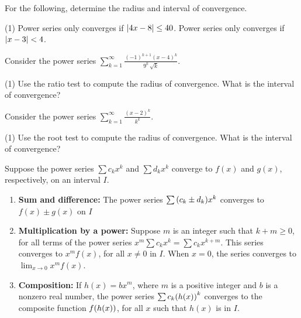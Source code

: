 \documentclass[../mathNotesPreamble]{subfiles}
\begin{document}
  \begin{ex*}[\textcolor{blue}{LC 28.4-28.5}]
    For the following, determine the radius and interval of convergence.
  \end{ex*}
  \begin{tasks}[after-item-skip=\stretch{1}, label=,item-indent=0pt](1)
    \task Power series only converges if ${\left\vert4x-8\right\vert}\leq 40$.
    \task Power series only converges if ${\left\vert x-3\right\vert}< 4$.
  \end{tasks}
  \pagebreak

  \begin{ex*}[\textcolor{blue}{LC 28.6-28.9}]
    Consider the power series $\displaystyle\sum_{k=1}^\infty \frac{(-1)^{k+1}(x-4)^k}{9^k\,\sqrt{k}}$.
  \end{ex*}
  \begin{tasks}[after-item-skip=\stretch{1}, label=,item-indent=0pt](1)
    \task Use the ratio test to compute the radius of convergence.
    \task What is the interval of convergence?
  \end{tasks}
  \pagebreak

  \begin{ex*}[\textcolor{blue}{LC 28.10-28.13}]
    Consider the power series $\displaystyle\sum_{k=1}^\infty \frac{(x-2)^k}{k^k}$.
  \end{ex*}
  \begin{tasks}[after-item-skip=\stretch{1}, label=,item-indent=0pt](1)
    \task Use the root test to compute the radius of convergence.
    \task What is the interval of convergence?
  \end{tasks}
  \pagebreak

  \begin{thmBox*}
    Suppose the power series $\sum c_kx^k$ and $\sum d_k x^k$ converge to $f(x)$ and $g(x)$, respectively, on an interval $I$.
      \begin{enumerate}
        \item \textbf{Sum and difference:} The power series $\sum{\left(c_k\pm d_k\right)}x^k$ converges to $f(x)\pm g(x)$ on $I$
        \item \textbf{Multiplication by a power:} Suppose $m$ is an integer such that $k+m\geq 0$, for all terms of the power series $x^m\sum c_k x^k=\sum c_k x^{k+m}$. This series converges to $x^m f(x)$, for all $x\neq 0$ in $I$. When $x=0$, the series converges to $\displaystyle\lim_{x\to 0} x^m f(x)$.
        \item \textbf{Composition:} If $h(x)=bx^m$, where $m$ is a positive integer and $b$ is a nonzero real number, the power series $\sum c_k{\left(h(x)\right)}^k$ converges to the composite function $f{\left(h(x)\right)}$, for all $x$ such that $h(x)$ is in $I$.
      \end{enumerate}
  \end{thmBox*}
\end{document}
